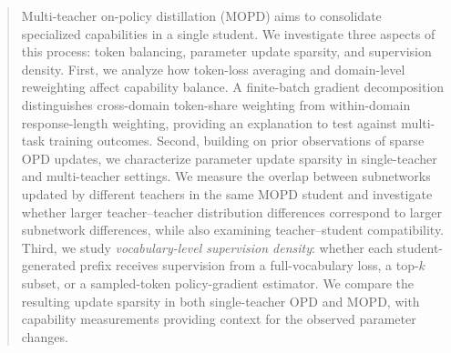 \begin{abstract}
Multi-teacher on-policy distillation (MOPD) aims to consolidate specialized
capabilities in a single student. We investigate three aspects of this
process: token balancing, parameter update sparsity, and supervision
density. First, we analyze how token-loss averaging and domain-level
reweighting affect capability balance. A finite-batch gradient
decomposition distinguishes cross-domain token-share weighting from
within-domain response-length weighting, providing an explanation to
test against multi-task training outcomes. Second, building on prior
observations of sparse OPD updates, we characterize parameter update
sparsity in single-teacher and multi-teacher settings. We measure the
overlap between subnetworks updated by different teachers in the same
MOPD student and investigate whether larger teacher--teacher distribution
differences correspond to larger subnetwork differences, while also
examining teacher--student compatibility. Third, we study
\emph{vocabulary-level supervision density}: whether each student-generated
prefix receives supervision from a full-vocabulary loss, a top-$k$
subset, or a sampled-token policy-gradient estimator. We compare the
resulting update sparsity in both single-teacher OPD and MOPD, with
capability measurements providing context for the observed parameter
changes.
\end{abstract}
